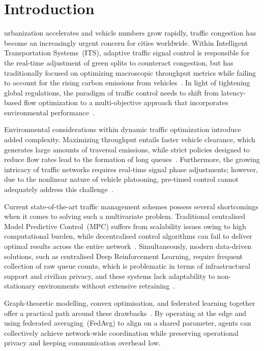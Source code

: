 \documentclass[journal]{IEEEtran}
\begin{document}
\IEEEpeerreviewmaketitle

\section{Introduction}
 urbanization accelerates and vehicle numbers grow rapidly, traffic congestion has become an increasingly urgent concern for cities worldwide. Within Intelligent Transportation Systems~(ITS), adaptive traffic signal control is responsible for the real-time adjustment of green splits to counteract congestion, but has traditionally focused on optimizing macroscopic throughput metrics while failing to account for the rising carbon emissions from vehicles~\cite{Zhu2025, Chen2025_tits, Li2025_tits}. In light of tightening global regulations, the paradigm of traffic control needs to shift from latency-based flow optimization to a multi-objective approach that incorporates environmental performance~\cite{Wang2026_tits, Zhang2026_tits, singleMPC}.

Environmental considerations within dynamic traffic optimization introduce added complexity. Maximizing throughput entails faster vehicle clearance, which generates large amounts of traversal emissions, while strict policies designed to reduce flow rates lead to the formation of long queues~\cite{Liu2025_tits}. Furthermore, the growing intricacy of traffic networks requires real-time signal phase adjustments; however, due to the nonlinear nature of vehicle platooning, pre-timed control cannot adequately address this challenge~\cite{Wu2026_tits, Zhou2026_tits, Sun2025_tits}.

Current state-of-the-art traffic management schemes possess several shortcomings when it comes to solving such a multivariate problem. Traditional centralised Model Predictive Control~(MPC) suffers from scalability issues owing to high computational burden, while decentralised control algorithms can fail to deliver optimal results across the entire network~\cite{Huang2025_tits}. Simultaneously, modern data-driven solutions, such as centralised Deep Reinforcement Learning, require frequent collection of raw queue counts, which is problematic in terms of infrastructural support and civilian privacy, and these systems lack adaptability to non-stationary environments without extensive retraining~\cite{Yang2026_tits, clusteredFL, Zhao2026_tits}.

Graph-theoretic modelling, convex optimisation, and federated learning together offer a practical path around these drawbacks~\cite{positionFL, stcl, Lin2025_tits, Xu2026_tits}. By operating at the edge and using federated averaging~(FedAvg) to align on a shared parameter, agents can collectively achieve network-wide coordination while preserving operational privacy and keeping communication overhead low.
\end{document}
